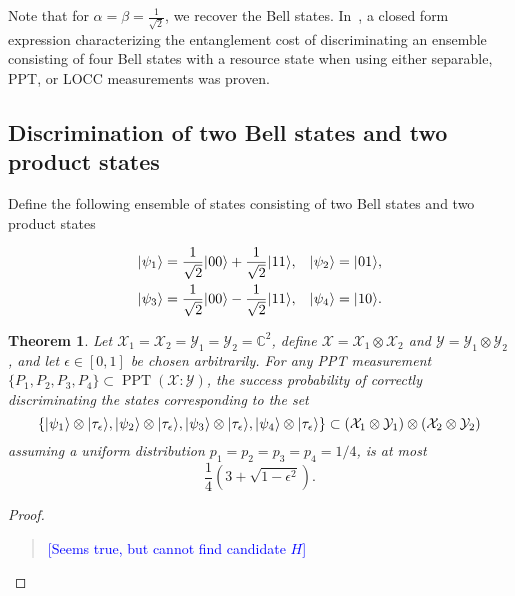 \documentclass[11pt]{article}
\newtheorem{theorem}{Theorem}
\theoremstyle{definition}
\newcommand{\comment}[1]{\begin{quote}\sf 
    \textcolor{blue}{[#1]}\end{quote}}
\newcommand{\microspace}{\mspace{0.5mu}}
\newcommand{\ppt}{\operatorname{PPT}}
\newcommand{\ket}[1]{
  \lvert\microspace #1 \microspace \rangle}
\newcommand{\complex}{\mathbb{C}}
\newcommand{\X}{\mathcal{X}}
\newcommand{\Y}{\mathcal{Y}}
\begin{document}
Note that for $\alpha = \beta = \frac{1}{\sqrt{2}}$, we recover the Bell
states. In~\cite{bandyopadhyay2015limitations}, a closed form expression
characterizing the entanglement cost of discriminating an ensemble consisting
of four Bell states with a resource state when using either separable, PPT, or
LOCC measurements was proven.

\subsection*{Discrimination of two Bell states and two product states}
\label{sec:discrim-two-bell-two-product}

Define the following ensemble of states consisting of two Bell states and two
product states

\begin{equation}\label{eq:two-bell-two-product}
\begin{aligned}
    \ket{\psi_1} = \frac{1}{\sqrt{2}} \ket{00} + \frac{1}{\sqrt{2}} \ket{11}, &\quad
    \ket{\psi_2} = \ket{01}, \\
    \ket{\psi_3} = \frac{1}{\sqrt{2}} \ket{00} - \frac{1}{\sqrt{2}} \ket{11}, &\quad
    \ket{\psi_4} = \ket{10}.
\end{aligned}
\end{equation}

\begin{theorem}\label{thm:two-bell-two-prod}
    Let $\X_1 = \X_2 = \Y_1 = \Y_2 = \complex^2$, define $\X = \X_1 \otimes
    \X_2$ and $\Y = \Y_1 \otimes \Y_2$, and let $\epsilon \in [0,1]$ be chosen
    arbitrarily. For any PPT measurement $\{ P_1, P_2, P_3, P_4\}
    \subset \ppt(\X : \Y)$, the success probability of correctly discriminating
    the states corresponding to the set 
	\begin{equation}
        \left\{ 
            \ket{\psi_1} \otimes \ket{\tau_{\epsilon}},
            \ket{\psi_2} \otimes \ket{\tau_{\epsilon}},
            \ket{\psi_3} \otimes \ket{\tau_{\epsilon}},
            \ket{\psi_4} \otimes \ket{\tau_{\epsilon}}
        \right\} \subset 
        \left(\X_1 \otimes \Y_1 \right) \otimes \left(\X_2 \otimes \Y_2 \right)
	\end{equation}
    assuming a uniform distribution $p_1 = p_2 = p_3 = p_4 = 1/4$, is at most
    \begin{equation}
        \frac{1}{4} \left(3 + \sqrt{1 - \epsilon^2} \right).
    \end{equation}
\end{theorem}
\begin{proof}
    \comment{Seems true, but cannot find candidate $H$}
\end{proof}
\end{document}
